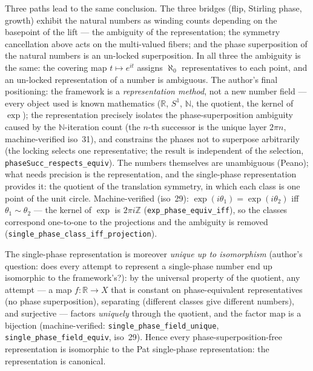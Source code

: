 \documentclass{article}
\begin{document}
Three paths lead to the same conclusion. The three bridges (flip,
Stirling phase, growth) exhibit the natural numbers as winding counts
depending on the basepoint of the lift --- the ambiguity of the
representation; the symmetry cancellation above acts on the multi-valued
fibers; and the phase superposition of the natural numbers is an
un-locked superposition. In all three the ambiguity is the same: the
covering map $t\mapsto e^{it}$ assigns $\aleph_0$ representatives to
each point, and an un-locked representation of a number is ambiguous.
The author's final positioning: the framework is a \emph{representation
method}, not a new number field --- every object used is known
mathematics ($\mathbb R$, $S^1$, $\mathbb N$, the quotient, the kernel
of $\exp$); the representation precisely isolates the phase-superposition
ambiguity caused by the $\mathbb N$-iteration count (the $n$-th
successor is the unique layer $2\pi n$, machine-verified iso~31), and
constrains the phases not to superpose arbitrarily (the locking selects
one representative; the result is independent of the selection,
\texttt{phaseSucc\_respects\_equiv}). The numbers themselves are
unambiguous (Peano); what needs precision is the representation, and
the single-phase representation provides it: the quotient of the
translation symmetry, in which each class is one point of the unit
circle.
Machine-verified (iso~29):
$\exp(i\theta_1)=\exp(i\theta_2)$ iff $\theta_1\sim\theta_2$ --- the
kernel of $\exp$ is $2\pi i\mathbb Z$
(\texttt{exp\_phase\_equiv\_iff}), so the classes correspond
one-to-one to the projections and the ambiguity is removed
(\texttt{single\_phase\_class\_iff\_projection}).

The single-phase representation is moreover \emph{unique up to
isomorphism} (author's question: does every attempt to represent a
single-phase number end up isomorphic to the framework's?): by the
universal property of the quotient, any attempt --- a map
$f:\mathbb R\to X$ that is constant on phase-equivalent representatives
(no phase superposition), separating (different classes give different
numbers), and surjective --- factors \emph{uniquely} through the
quotient, and the factor map is a bijection
(machine-verified: \texttt{single\_phase\_field\_unique},
\texttt{single\_phase\_field\_equiv}, iso~29). Hence every
phase-superposition-free representation is isomorphic to the Pat
single-phase representation: the representation is canonical.
\end{document}
